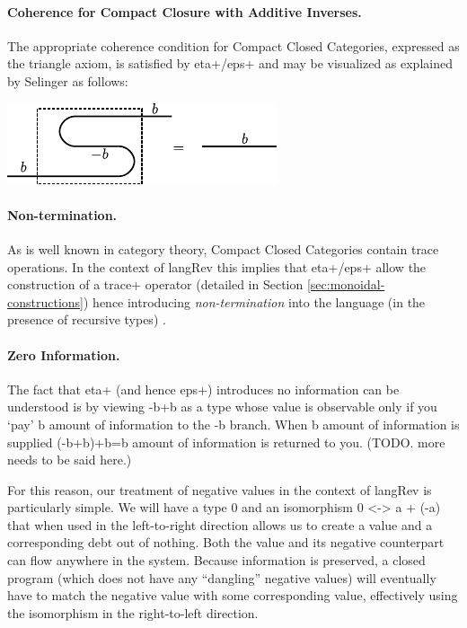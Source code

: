 \documentclass[preprint]{sigplanconf}
\begin{document}
\paragraph*{Coherence for Compact Closure with Additive Inverses.}
The appropriate coherence condition for Compact Closed Categories,
expressed as the triangle axiom, is satisfied by {{eta+}}/{{eps+}} and
may be visualized as explained by Selinger
\cite{springerlink:10.1007/978-3-642-12821-94} as follows:

\begin{center}
  \includegraphics{diagrams/coherence.pdf}
\end{center}


\paragraph*{Non-termination.}
As is well known in category theory, Compact Closed Categories contain
trace operations.  In the context of {{langRev}} this implies that
{{eta+}}/{{eps+}} allow the construction of a {{trace+}} operator
(detailed in Section \ref{sec:monoidal-constructions}) hence
introducing \emph{non-termination} into the language (in the presence
of recursive types) \cite{infeffects}.

\paragraph*{Zero Information.}
The fact that {{eta+}} (and hence {{eps+}}) introduces no information
can be understood is by viewing {{-b+b}} as a type whose value is
observable only if you `pay' {{b}} amount of information to the {{-b}}
branch. When {{b}} amount of information is supplied {{(-b+b)+b=b}}
amount of information is returned to you. (TODO. more needs to be said
here.)

For this reason, our treatment of negative values in the context of
{{langRev}} is particularly simple. We will have a type $0$ and an
isomorphism {{0 <-> a + (-a)}} that when used in the left-to-right direction
allows us to create a value and a corresponding debt out of nothing. Both the
value and its negative counterpart can flow anywhere in the system. Because
information is preserved, a closed program (which does not have any
``dangling'' negative values) will eventually have to match the negative
value with some corresponding value, effectively using the isomorphism in the
right-to-left direction. 
\end{document}
